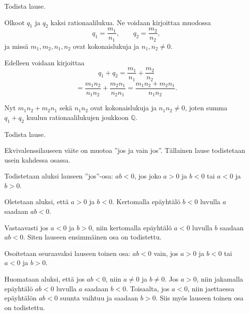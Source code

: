 \begin{esimerkki}
 Todista lause.


\begin{todistus}
Olkoot $q_1$ ja $q_2$ kaksi rationaalilukua. Ne voidaan kirjoittaa muodossa
\[
q_1=\frac{m_1}{n_1},\qquad 
q_2=\frac{m_2}{n_2},
\]
ja missä $m_1,m_2,n_1,n_2$ ovat kokonaislukuja ja $n_1,n_2\neq 0$.

Edelleen voidaan kirjoittaa
\[
q_1+q_2 = \frac{m_1}{n_1}+ \frac{m_2}{n_2}
\]
\[
= \frac{m_1 n_2}{n_1 n_2}+ \frac{m_2 n_1}{n_2 n_1} = \frac{m_1n_2 + m_2 n_1}{n_1 n_2}.
\]

Nyt $m_1n_2 + m_2 n_1$ sekä $n_1 n_2$ ovat kokonaislukuja ja $n_1 n_2\neq 0$, joten summa $q_1+q_2$ kuuluu rationaalilukujen joukkoon $\mathbb{Q}$.
\end{todistus}
\end{esimerkki}

\begin{esimerkki}
Todista lause.


\begin{todistus}
Ekvivalenssilauseen väite on muotoa ''jos ja vain jos''. Tällainen lause todistetaan usein kahdessa osassa.

Todistetaan aluksi lauseen ''jos''-osa: $ab<0$, jos joko $a>0$ ja $b<0$ tai $a<0$ ja $b>0$.

Oletetaan aluksi, että $a>0$ ja $b<0$. Kertomalla epäyhtälö $b<0$ luvulla $a$ saadaan $ab<0$.

Vastaavasti jos $a<0$ ja $b>0$, niin kertomalla epäyhtälö $a<0$ luvulla $b$ saadaan $ab<0$. Siten lauseen ensimmäinen osa on todistettu.

Osoitetaan seuraavaksi lauseen toinen osa: $ab<0$ vain, jos $a>0$ ja $b<0$ tai $a<0$ ja $b>0$.

Huomataan aluksi, että jos $ab<0$, niin $a\neq 0$ ja $b\neq 0$. Jos $a>0$, niin jakamalla epäyhtälö $ab<0$ luvulla $a$ saadaan $b<0$. Toisaalta, jos $a<0$, niin jaettaessa epäyhtälön $ab<0$ suunta vaihtuu ja saadaan $b>0$. Siis myös lauseen toinen osa on todistettu.
\end{todistus}

\end{esimerkki}

